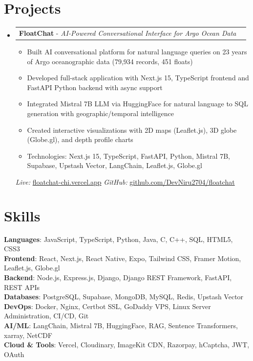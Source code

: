 \documentclass[letterpaper,10pt]{article}
\makeatletter
\newcommand{\resumeItem}[1]{
    \item\small{#1 \vspace{-3pt}}
}
\newcommand{\resumeProjectHeading}[2]{
    \item
    \begin{tabular*}{0.97\textwidth}{l@{\extracolsep{\fill}}r}
        \small#1 & #2 \\
    \end{tabular*}\vspace{-8pt}
}
\newcommand{\resumeSubHeadingListStart}{\begin{itemize}[leftmargin=0.15in, label={}]}
\newcommand{\resumeSubHeadingListEnd}{\end{itemize}}
\newcommand{\resumeItemListStart}{\begin{itemize}}
\newcommand{\resumeItemListEnd}{\end{itemize}\vspace{-6pt}}
\makeatother
\begin{document}
\section{Projects}
    \resumeSubHeadingListStart
        \resumeProjectHeading
            {\textbf{FloatChat} - \emph{AI-Powered Conversational Interface for Argo Ocean Data}}{}
            \resumeItemListStart
                \resumeItem{Built AI conversational platform for natural language queries on 23 years of Argo oceanographic data (79,934 records, 451 floats)}
                \resumeItem{Developed full-stack application with Next.js 15, TypeScript frontend and FastAPI Python backend with async support}
                \resumeItem{Integrated Mistral 7B LLM via HuggingFace for natural language to SQL generation with geographic/temporal intelligence}
                \resumeItem{Created interactive visualizations with 2D maps (Leaflet.js), 3D globe (Globe.gl), and depth profile charts}
                \resumeItem{Technologies: Next.js 15, TypeScript, FastAPI, Python, Mistral 7B, Supabase, Upstash Vector, LangChain, Leaflet.js, Globe.gl}
            \resumeItemListEnd
            \vspace{5pt}
            \small{\textit{Live:} \href{https://floatchat-chi.vercel.app}{floatchat-chi.vercel.app}  \textit{GitHub:} \href{https://github.com/DevNiru2704/floatchat}{github.com/DevNiru2704/floatchat}}
    \resumeSubHeadingListEnd

\section{Skills}
    \begin{itemize}[leftmargin=0.15in, label={}]
        \small{\item{
            \textbf{Languages}{: JavaScript, TypeScript, Python, Java, C, C++, SQL, HTML5, CSS3} \\
            \textbf{Frontend}{: React, Next.js, React Native, Expo, Tailwind CSS, Framer Motion, Leaflet.js, Globe.gl} \\
            \textbf{Backend}{: Node.js, Express.js, Django, Django REST Framework, FastAPI, REST APIs} \\
            \textbf{Databases}{: PostgreSQL, Supabase, MongoDB, MySQL, Redis, Upstash Vector} \\
            \textbf{DevOps}{: Docker, Nginx, Certbot SSL, GoDaddy VPS, Linux Server Administration, CI/CD, Git} \\
            \textbf{AI/ML}{: LangChain, Mistral 7B, HuggingFace, RAG, Sentence Transformers, xarray, NetCDF} \\
            \textbf{Cloud \& Tools}{: Vercel, Cloudinary, ImageKit CDN, Razorpay, hCaptcha, JWT, OAuth}
        }}
    \end{itemize}
\end{document}

